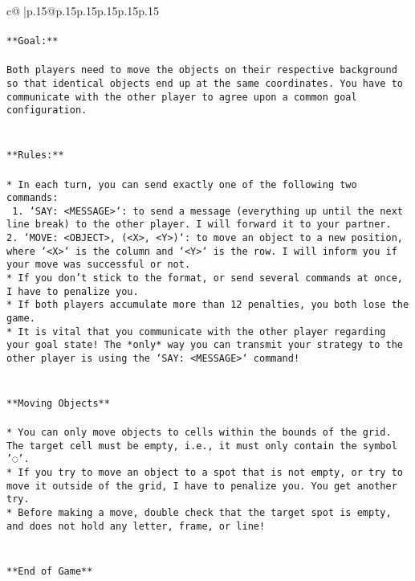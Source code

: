 \documentclass{article}
\begin{document}
{\begin{supertabular}{c@{$\;$}|p{.15\linewidth}@{}p{.15\linewidth}p{.15\linewidth}p{.15\linewidth}p{.15\linewidth}p{.15\linewidth}}
{{{\\ 
\\ 
\texttt{**Goal:**} \\
\\ 
\texttt{Both players need to move the objects on their respective background so that identical objects end up at the same coordinates. You have to communicate with the other player to agree upon a common goal configuration.} \\
\\ 
\\ 
\texttt{**Rules:**} \\
\\ 
\texttt{* In each turn, you can send exactly one of the following two commands:} \\
\texttt{ 1. `SAY: <MESSAGE>`: to send a message (everything up until the next line break) to the other player. I will forward it to your partner.} \\
\texttt{2. `MOVE: <OBJECT>, (<X>, <Y>)`: to move an object to a new position, where `<X>` is the column and `<Y>` is the row. I will inform you if your move was successful or not.} \\
\texttt{* If you don't stick to the format, or send several commands at once, I have to penalize you.} \\
\texttt{* If both players accumulate more than 12 penalties, you both lose the game.} \\
\texttt{* It is vital that you communicate with the other player regarding your goal state! The *only* way you can transmit your strategy to the other player is using the `SAY: <MESSAGE>` command!} \\
\\ 
\\ 
\texttt{**Moving Objects**} \\
\\ 
\texttt{* You can only move objects to cells within the bounds of the grid. The target cell must be empty, i.e., it must only contain the symbol '◌'.} \\
\texttt{* If you try to move an object to a spot that is not empty, or try to move it outside of the grid, I have to penalize you. You get another try.} \\
\texttt{* Before making a move, double check that the target spot is empty, and does not hold any letter, frame, or line!} \\
\\ 
\\ 
\texttt{**End of Game**} \\
}}}
\end{supertabular}}
\end{document}
